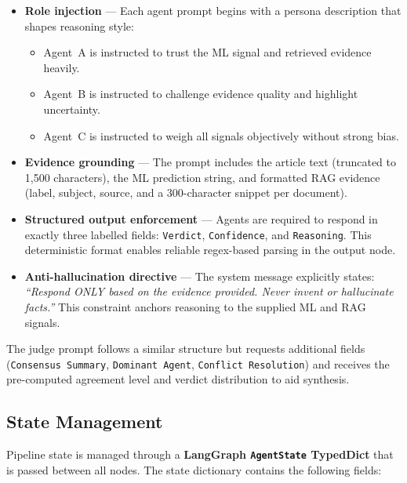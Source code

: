 \documentclass[12pt, a4paper]{article}
\begin{document}
\begin{itemize}[leftmargin=2em]
    \item \textbf{Role injection} --- Each agent prompt begins with a
          persona description that shapes reasoning style:
          \begin{itemize}
              \item Agent~A is instructed to trust the ML signal and
                    retrieved evidence heavily.
              \item Agent~B is instructed to challenge evidence quality and
                    highlight uncertainty.
              \item Agent~C is instructed to weigh all signals objectively
                    without strong bias.
          \end{itemize}
    \item \textbf{Evidence grounding} --- The prompt includes the article
          text (truncated to 1{,}500 characters), the ML prediction string,
          and formatted RAG evidence (label, subject, source, and a
          300-character snippet per document).
    \item \textbf{Structured output enforcement} --- Agents are required to
          respond in exactly three labelled fields:
          \texttt{Verdict}, \texttt{Confidence}, and \texttt{Reasoning}.
          This deterministic format enables reliable regex-based parsing in
          the output node.
    \item \textbf{Anti-hallucination directive} --- The system message
          explicitly states: \textit{``Respond ONLY based on the evidence
          provided. Never invent or hallucinate facts.''} This constraint
          anchors reasoning to the supplied ML and RAG signals.
\end{itemize}

The judge prompt follows a similar structure but requests additional fields
(\texttt{Consensus Summary}, \texttt{Dominant Agent},
\texttt{Conflict Resolution}) and receives the pre-computed agreement
level and verdict distribution to aid synthesis.


\subsection{State Management}

Pipeline state is managed through a \textbf{LangGraph \texttt{AgentState}
TypedDict} that is passed between all nodes. The state dictionary contains
the following fields:
\end{document}

